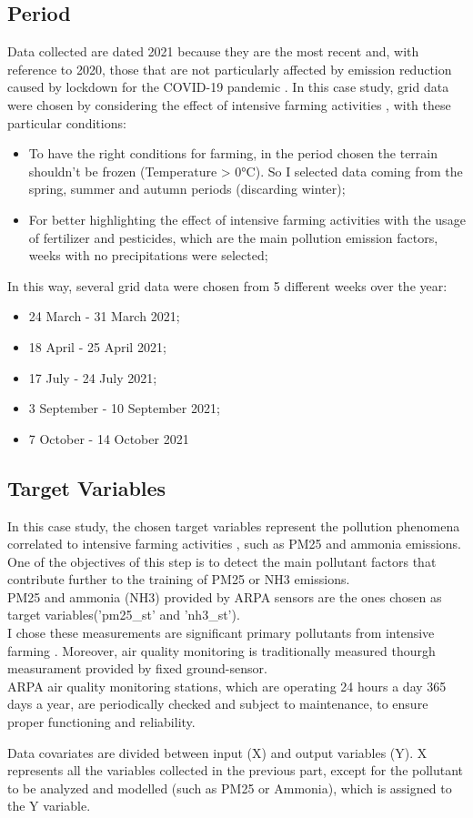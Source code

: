 \subsection{Period}  
Data collected are dated 2021 because they are the most recent and, with reference to 2020, those that are not particularly affected by emission reduction caused by lockdown for the COVID-19 pandemic \cite{bontempi2022analysis}. 
\pagebreak
In this case study, grid data were chosen by considering the effect of intensive farming activities , with these particular conditions:
    \begin{itemize}
        \item To have the right conditions for farming, in the period chosen the terrain shouldn't be frozen (Temperature > 0°C). So I selected data coming from the spring, summer and autumn periods (discarding winter);
        \item For better highlighting the effect of intensive farming activities with the usage of fertilizer and pesticides, which are the main pollution emission factors, weeks with no precipitations were selected;
\end{itemize}
In this way, several grid data were chosen from 5 different weeks over the year:
\begin{itemize}
    \item 24 March - 31 March 2021;
    \item 18 April - 25 April 2021;
    \item 17 July - 24 July 2021;
    \item 3 September - 10 September 2021;
    \item 7 October - 14 October 2021
\end{itemize}

\subsection{Target Variables}
In this case study, the chosen target variables represent the pollution phenomena correlated to intensive farming activities , such as PM25 and ammonia emissions. \\
One of the objectives of this step is to detect the main pollutant factors that contribute further to the training of PM25 or NH3 emissions.\\
PM25 and ammonia (NH3) provided by ARPA sensors are the ones chosen as target variables('pm25\_st' and 'nh3\_st').\\
I chose these measurements are significant primary pollutants from intensive farming \cite{aneja2008farming}. Moreover, air quality monitoring is traditionally measured thourgh measurament provided by fixed ground-sensor.
\\
ARPA air quality monitoring stations, which are operating 24 hours a day 365 days a year, are periodically checked and subject to maintenance, to ensure proper functioning and reliability.\par
Data covariates are divided between input (X) and output variables (Y). X represents all the variables collected in the previous part, except for the pollutant to be analyzed and modelled (such as PM25 or Ammonia), which is assigned to the Y variable.

